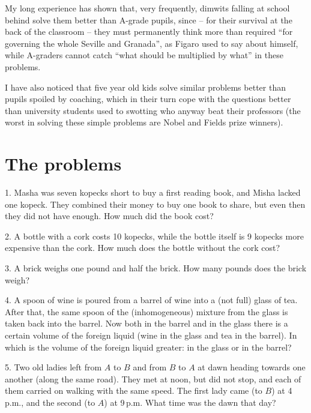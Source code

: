 My long experience has shown that, very frequently, dimwits falling at school behind solve them better
than A-grade pupils, since -- for their survival at the back of the classroom -- they must permanently
think more than required \enquote{for governing the whole Seville and Granada}, as Figaro used to say about
himself, while A-graders cannot catch \enquote{what should be multiplied by what} in these problems.

I have also noticed that five year old kids solve similar problems better than pupils spoiled
by coaching, which in their turn cope with the questions better than university students used
to swotting who anyway beat their professors (the worst in solving these simple problems are
Nobel and Fields prize winners).

\clearpage
\section*{The problems}

\begin{problem}{1.}
	Masha was seven kopecks short to buy a first reading book, and Misha lacked one kopeck.
	They combined their money to buy one book to share, but even then they did not have enough.
	How much did the book cost?
\end{problem}

\begin{problem}{2.}
	A bottle with a cork costs 10 kopecks, while the bottle itself is 9 kopecks more expensive
	than the cork. How much does the bottle without the cork cost?
\end{problem}

\begin{problem}{3.}
	A brick weighs one pound and half the brick. How many pounds does the brick weigh?
\end{problem}

\begin{problem}{4.}
	A spoon of wine is poured from a barrel of wine into a (not full) glass of tea.
	After that, the same spoon of the (inhomogeneous) mixture from the glass is taken back into the barrel.
	Now both in the barrel and in the glass there is a certain volume of the foreign liquid (wine in the glass and
	tea in the barrel). In which is the volume of the foreign liquid greater: in the glass or in the barrel?
\end{problem}

\begin{problem}{5.}
	Two old ladies left from $A$ to $B$ and from $B$ to $A$ at dawn
	heading towards one another (along the same road). They met at noon,
	but did not stop, and each of them carried on walking with the same speed.
	The first lady came (to $B$) at 4\,p.m., and the second (to $A$) at 9\,p.m. What time was the dawn that day?
\end{problem}

